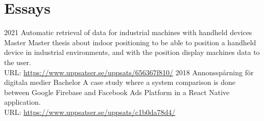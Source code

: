 \section{Essays}



\begin{entrylist}
  \entry
    {2021}
    {Automatic retrieval of data for industrial machines with handheld devices}
    {Master}
    {%
    Master thesis about indoor positioning to be able to position a handheld device in industrial environments, and with the position display machines data to the user. \\URL: \href{https://www.uppsatser.se/uppsats/656367f810/}{https://www.uppsatser.se/uppsats/656367f810/}
    }
  \entry
    {2018}
    {Annonsspårning för digitala medier}
    {Bachelor}
    {%
      A case study where a system comparison is done between Google Firebase and Facebook Ads Platform in a React Native application. \\URL: \href{https://www.uppsatser.se/uppsats/c1b0da78d4/}{https://www.uppsatser.se/uppsats/c1b0da78d4/}
      }
\end{entrylist}
